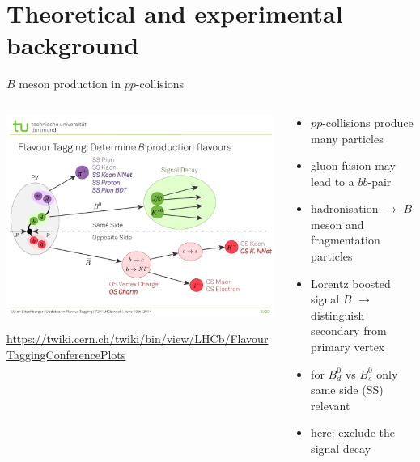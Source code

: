 \documentclass[aspectratio=1610, 10pt]{beamer}
\begin{document}
\section*{Theoretical and experimental background}

\begin{frame}{$B$ meson production in $pp$-collisions}
  \begin{columns}
    \begin{column}{0.6\textwidth}
      \includegraphics[width=\textwidth]{images/FlavourTaggingScheme.pdf}

      \small \url{https://twiki.cern.ch/twiki/bin/view/LHCb/FlavourTaggingConferencePlots}
    \end{column}
    \begin{column}{0.4\textwidth}
      \begin{itemize}
        \item $pp$-collisions produce many particles
        \item gluon-fusion may lead to a $b\bar{b}$-pair
        \item hadronisation $\rightarrow$ $B$ meson and fragmentation particles
        \item Lorentz boosted signal $B$ $\rightarrow$ distinguish secondary from primary vertex
        \item for $B^0_d$ vs $B^0_s$ only same side (SS) relevant
        \item here: exclude the signal decay
      \end{itemize}
    \end{column}
  \end{columns}
\end{frame}
\end{document}
